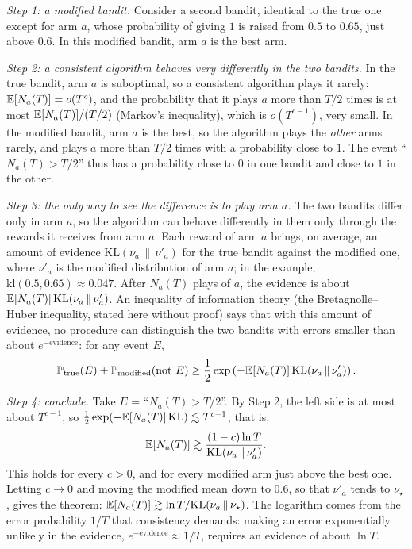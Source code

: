 \emph{Step 1: a modified bandit.} Consider a second bandit, identical to
the true one except for arm $a$, whose probability of giving $1$ is raised
from $0.5$ to $0.65$, just above $0.6$. In this modified bandit, arm $a$ is
the best arm.

\emph{Step 2: a consistent algorithm behaves very differently in the two
bandits.} In the true bandit, arm $a$ is suboptimal, so a consistent
algorithm plays it rarely: $\mathbb{E}[N_a(T)] = o(T^c)$, and the probability
that it plays $a$ more than $T/2$ times is at most $\mathbb{E}[N_a(T)] / (T/2)$
(Markov's inequality), which is $o(T^{c - 1})$, very small. In the
modified bandit, arm $a$ is the best, so the algorithm plays the
\emph{other} arms rarely, and plays $a$ more than $T/2$ times with a
probability close to $1$. The event ``$N_a(T) > T/2$'' thus has a
probability close to $0$ in one bandit and close to $1$ in the other.

\emph{Step 3: the only way to see the difference is to play arm $a$.} The
two bandits differ only in arm $a$, so the algorithm can behave
differently in them only through the rewards it receives from arm $a$. Each
reward of arm $a$ brings, on average, an amount of evidence
$\mathrm{KL}(\nu_a \,\|\, \nu'_a)$ for the true bandit against the modified
one, where $\nu'_a$ is the modified distribution of arm $a$; in the example,
$\mathrm{kl}(0.5, 0.65) \approx 0.047$. After $N_a(T)$ plays of $a$, the
evidence is about $\mathbb{E}[N_a(T)]\, \mathrm{KL}(\nu_a \,\|\, \nu'_a)$. An
inequality of information theory (the Bretagnolle--Huber inequality, stated
here without proof) says that with this amount of evidence, no procedure
can distinguish the two bandits with errors smaller than about
$e^{-\text{evidence}}$: for any event $E$,
\begin{equation*}
  \mathbb{P}_{\text{true}}(E) + \mathbb{P}_{\text{modified}}(\text{not } E) \geq
  \frac{1}{2} \exp\left( - \mathbb{E}[N_a(T)]\, \mathrm{KL}(\nu_a \,\|\, \nu'_a)
  \right).
\end{equation*}

\emph{Step 4: conclude.} Take $E$ = ``$N_a(T) > T/2$''. By Step 2, the left
side is at most about $T^{c - 1}$, so $\frac{1}{2} \exp(-\mathbb{E}[N_a(T)]\,
\mathrm{KL}) \lesssim T^{c - 1}$, that is,
\begin{equation*}
  \mathbb{E}[N_a(T)] \gtrsim \frac{(1 - c) \ln T}{\mathrm{KL}(\nu_a \,\|\,
  \nu'_a)}.
\end{equation*}
This holds for every $c > 0$, and for every modified arm just above
the best one. Letting $c \to 0$ and moving the modified mean down to
$0.6$, so that $\nu'_a$ tends to $\nu_\star$, gives the theorem: $\mathbb{E}[N_a(T)]
\gtrsim \ln T / \mathrm{KL}(\nu_a \,\|\, \nu_\star)$. The logarithm comes
from the error probability $1/T$ that consistency demands: making an
error exponentially unlikely in the evidence, $e^{-\text{evidence}} \approx
1/T$, requires an evidence of about $\ln T$.

